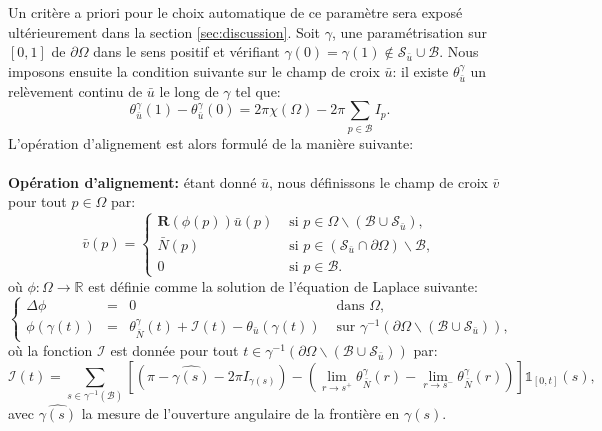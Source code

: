 Un critère a priori pour le choix automatique de ce paramètre sera exposé ultérieurement dans la section \ref{sec:discussion}. Soit $\gamma$, une paramétrisation sur $[0, 1]$ de $\partial\Omega$ dans le sens positif et vérifiant $\gamma(0)=\gamma(1)\notin\mathcal{S}_{\bar{u}}\cup\mathcal{B}$. Nous imposons ensuite la condition suivante sur le champ de croix $\bar{u}$: il existe $\theta_{\bar{u}}^\gamma$ un relèvement continu de $\bar{u}$ le long de $\gamma$ tel que:
\begin{equation}
    \label{eqn:principe_hypothese_u}
    \theta_{\bar{u}}^\gamma(1)-\theta_{\bar{u}}^\gamma(0)=2\pi\chi(\Omega)-2\pi\sum_{p\in\mathcal{B}}I_p.
\end{equation}
L'opération d'alignement est alors formulé de la manière suivante:\\\\
\textbf{Opération d'alignement:} étant donné $\bar{u}$, nous définissons le champ de croix $\bar{v}$ pour tout $p\in\Omega$ par:
\begin{equation}
\bar{v}(p)=
\left\{
\begin{array}{ll}
\mathbf{R}(\phi(p))\bar{u}(p) & \mbox{ si } p\in\Omega\backslash(\mathcal{B}\cup\mathcal{S}_{\bar{u}}),\\[0.5cm]
\bar{N}(p) & \mbox{ si } p\in(\mathcal{S}_{\bar{u}}\cap\partial\Omega)\backslash\mathcal{B},\\[0.5cm]
0 & \mbox{ si } p\in\mathcal{B}.
\end{array}
\right.
\label{eqn:principe_def_v}
\end{equation}
où $\phi:\Omega\longrightarrow\mathbb{R}$ est définie comme la solution de l'équation de Laplace suivante:
\begin{equation}
\left\{
\begin{array}{lcll}
\Delta\phi &=& 0 &\mbox{ dans }\Omega,\\[0.5cm]
\phi(\gamma(t))&=&\theta_{\bar{N}}^\gamma(t)+\mathcal{I}(t)-\theta_{\bar{u}}(\gamma(t))& \mbox{ sur } \gamma^{-1}(\partial\Omega\backslash(\mathcal{B}\cup\mathcal{S}_{\bar{u}})),
\end{array}
\right.
\label{eqn:principe_def_phi}
\end{equation}
où la fonction $\mathcal{I}$ est donnée pour tout $t\in\gamma^{-1}(\partial\Omega\backslash(\mathcal{B}\cup\mathcal{S}_{\bar{u}}))$ par:
$$
\mathcal{I}(t)=\sum_{s\in\gamma^{-1}(\mathcal{B})}\left[\left(\pi-\widehat{\gamma(s)}-2\pi I_{\gamma(s)}\right)-\left(\lim\limits_{r\rightarrow s^+}\theta^{\gamma}_{\bar{N}}(r) - \lim\limits_{r\rightarrow s^-}\theta^{\gamma}_{\bar{N}}(r)\right)\right]\mathbb{1}_{[0, t]}(s),
$$
avec $\widehat{\gamma(s)}$ la mesure de l'ouverture angulaire de la frontière en $\gamma(s)$.

